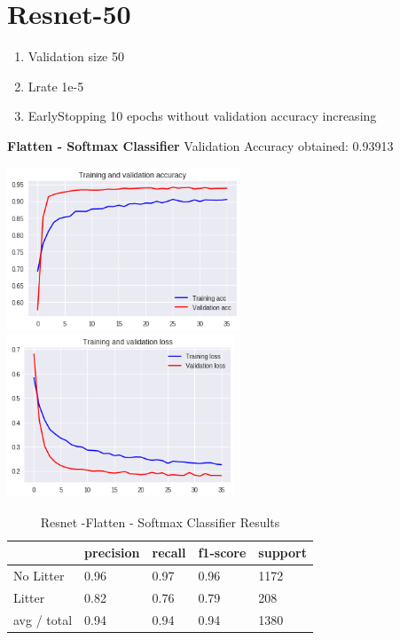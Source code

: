 \documentclass{IEEEtran}
\title{}
\begin{document}
\section{Resnet-50}

\begin{enumerate}
\item Validation size 50 
\item Lrate 1e-5
\item EarlyStopping 10 epochs without validation accuracy increasing
\end{enumerate}

\bigskip

\textbf{Flatten - Softmax Classifier}
Validation Accuracy obtained: 0.93913

\includegraphics[width=2.7374in,height=1.9201in]{resnet-img/resnet-img001.png} 
\includegraphics[width=2.6772in,height=1.9028in]{resnet-img/resnet-img002.png} 

\begin{table}[ht]
\centering
\caption{Resnet -Flatten - Softmax Classifier Results}
\begin{tabular}{|l|l|l|l|l|} 
\hline
 & precision & recall  & f1-score  & support \\\hline
No Litter  & 0.96  & 0.97  & 0.96  & 1172 \\\hline
Litter  & 0.82  & 0.76  & 0.79  & 208 \\\hline
avg / total  & 0.94  & 0.94 & 0.94 & 1380\\\hline
\end{tabular}
\end{table}
\end{document}
